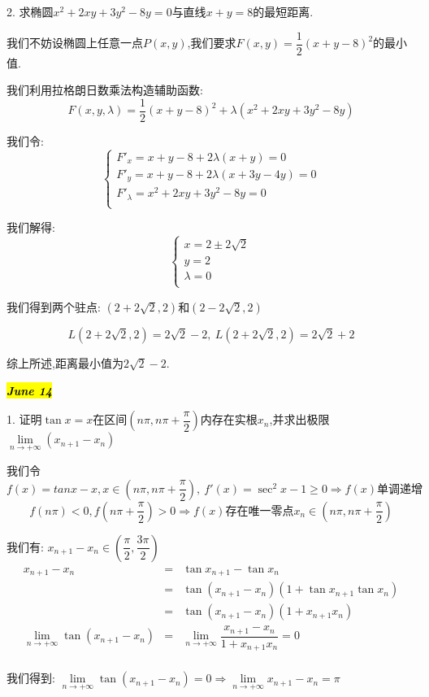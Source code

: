 2. 求椭圆$x^2+2xy+3y^2-8y=0$与直线$x+y=8$的最短距离.
\begin{solution}
	
	我们不妨设椭圆上任意一点$P(x,y)$,我们要求$F(x,y)=\dfrac{1}{2}(x+y-8)^2$的最小值.
	
	我们利用拉格朗日数乘法构造辅助函数: 
	$$F(x,y,\lambda)=\dfrac{1}{2}(x+y-8)^2+\lambda(x^2+2xy+3y^2-8y)$$
	
	我们令: $$\left\lbrace 
	\begin{array}{l}
		F'_{x}=x+y-8+2\lambda (x+y)=0\\
		F'_{y}=x+y-8+2\lambda(x+3y-4y)=0\\
		F'_{\lambda}=x^2+2xy+3y^2-8y=0\\
	\end{array}
	\right. $$
	
	我们解得: $$\left\lbrace 
	\begin{array}{l}
		x=2\pm 2\sqrt{2}\\
		y=2\\
		\lambda=0\\
	\end{array}
	\right. $$
	
	我们得到两个驻点: $(2+2\sqrt{2},2)$和$(2-2\sqrt{2},2)$
	
	$$L(2+2\sqrt{2},2)=2\sqrt{2}-2,\ L(2+2\sqrt{2},2)=2\sqrt{2}+2$$
	
	综上所述,距离最小值为$2\sqrt{2}-2$.
\end{solution}

\hl{\textbf{\textit{June 14}}}

1. 证明$\tan x=x$在区间$(n\pi,n\pi+\dfrac{\pi}{2})$内存在实根$x_{n}$,并求出极限$\lim\limits_{n\rightarrow +\infty}(x_{n+1}-x_{n})$
\begin{solution}
	
	我们令$f(x)=tan x-x,x\in(n\pi,n\pi+\dfrac{\pi}{2}),\ f'(x)=\sec^{2} x -1\geq 0\Rightarrow f(x)\text{单调递增}$
	$$f(n\pi)<0,f(n\pi+\dfrac{\pi}{2})>0\Rightarrow f(x)\text{存在唯一零点} x_{n}\in (n\pi,n\pi+\dfrac{\pi}{2})$$
	
	我们有: $x_{n+1}-x_{n}\in(\dfrac{\pi}{2},\dfrac{3\pi}{2})$
	\begin{eqnarray*}
		x_{n+1}-x_{n}&=&\tan x_{n+1}-\tan x_{n}\\
		&=&\tan(x_{n+1}-x_{n})(1+\tan x_{n+1}\tan x_{n})\\
		&=&\tan(x_{n+1}-x_{n})(1+x_{n+1}x_{n})\\
		\lim\limits_{n\rightarrow +\infty}\tan(x_{n+1}-x_{n})&=&\lim\limits_{n\rightarrow +\infty}\dfrac{x_{n+1}-x_{n}}{1+x_{n+1}x_{n}}=0\\
	\end{eqnarray*}
	
	我们得到: $\lim\limits_{n\rightarrow +\infty}\tan(x_{n+1}-x_{n})=0\Rightarrow \lim\limits_{n\rightarrow +\infty}x_{n+1}-x_{n}=\pi$
\end{solution}


